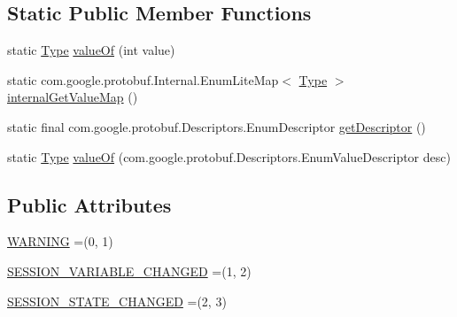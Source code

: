 \subsection*{Static Public Member Functions}
\begin{DoxyCompactItemize}
\item 
static \mbox{\hyperlink{enumcom_1_1mysql_1_1cj_1_1x_1_1protobuf_1_1_mysqlx_notice_1_1_frame_1_1_type}{Type}} \mbox{\hyperlink{enumcom_1_1mysql_1_1cj_1_1x_1_1protobuf_1_1_mysqlx_notice_1_1_frame_1_1_type_a217989bc360e5283627626bfe6864555}{value\+Of}} (int value)
\item 
static com.\+google.\+protobuf.\+Internal.\+Enum\+Lite\+Map$<$ \mbox{\hyperlink{enumcom_1_1mysql_1_1cj_1_1x_1_1protobuf_1_1_mysqlx_notice_1_1_frame_1_1_type}{Type}} $>$ \mbox{\hyperlink{enumcom_1_1mysql_1_1cj_1_1x_1_1protobuf_1_1_mysqlx_notice_1_1_frame_1_1_type_aae267ea57fea8f94470ebe5c951744a6}{internal\+Get\+Value\+Map}} ()
\item 
static final com.\+google.\+protobuf.\+Descriptors.\+Enum\+Descriptor \mbox{\hyperlink{enumcom_1_1mysql_1_1cj_1_1x_1_1protobuf_1_1_mysqlx_notice_1_1_frame_1_1_type_af9bb1206ab928bd5b84b552c8ba73dd2}{get\+Descriptor}} ()
\item 
static \mbox{\hyperlink{enumcom_1_1mysql_1_1cj_1_1x_1_1protobuf_1_1_mysqlx_notice_1_1_frame_1_1_type}{Type}} \mbox{\hyperlink{enumcom_1_1mysql_1_1cj_1_1x_1_1protobuf_1_1_mysqlx_notice_1_1_frame_1_1_type_a83b98fe3871ad65a3f2e7b93eee5eb53}{value\+Of}} (com.\+google.\+protobuf.\+Descriptors.\+Enum\+Value\+Descriptor desc)
\end{DoxyCompactItemize}
\subsection*{Public Attributes}
\begin{DoxyCompactItemize}
\item 
\mbox{\hyperlink{enumcom_1_1mysql_1_1cj_1_1x_1_1protobuf_1_1_mysqlx_notice_1_1_frame_1_1_type_a8c1f3afedf3321f90069ce36203cdc56}{W\+A\+R\+N\+I\+NG}} =(0, 1)
\item 
\mbox{\hyperlink{enumcom_1_1mysql_1_1cj_1_1x_1_1protobuf_1_1_mysqlx_notice_1_1_frame_1_1_type_a54d28ad3cde3a5c11ebe24b85f82e5ee}{S\+E\+S\+S\+I\+O\+N\+\_\+\+V\+A\+R\+I\+A\+B\+L\+E\+\_\+\+C\+H\+A\+N\+G\+ED}} =(1, 2)
\item 
\mbox{\hyperlink{enumcom_1_1mysql_1_1cj_1_1x_1_1protobuf_1_1_mysqlx_notice_1_1_frame_1_1_type_ac75fca29961449671a16d2eecc708c58}{S\+E\+S\+S\+I\+O\+N\+\_\+\+S\+T\+A\+T\+E\+\_\+\+C\+H\+A\+N\+G\+ED}} =(2, 3)
\end{DoxyCompactItemize}
